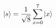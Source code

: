 \documentclass[preview]{standalone}
\begin{document}
\begin{align*}
\special{dvisvgm:raw <g id='unique000'>}|s\rangle=\frac{1}{\sqrt{8}}\sum_{x=0}^{7}|x\rangle\special{dvisvgm:raw </g>}
\end{align*}
\end{document}

